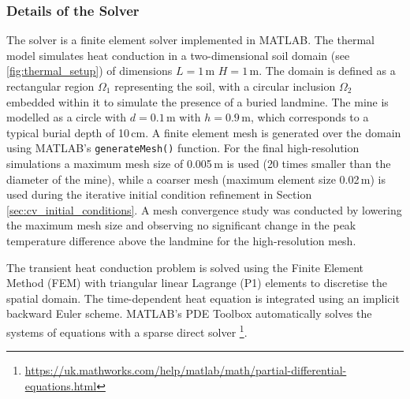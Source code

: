     
    \subsubsection{Details of the Solver}
    
        The solver is a finite element solver implemented in MATLAB. The thermal model simulates heat conduction in a two-dimensional soil domain (see \ref{fig:thermal_setup}) of dimensions $L =1$\,m $H = 1$\,m. The domain is defined as a rectangular region $\Omega_1$ representing the soil, with a circular inclusion $\Omega_2$ embedded within it to simulate the presence of a buried landmine. The mine is modelled as a circle with \(d=0.1\,\text{m}\) with \(h=0.9\,\text{m}\), which corresponds to a typical burial depth of 10\,cm. A finite element mesh is generated over the domain using MATLAB's \texttt{generateMesh()} function. For the final high-resolution simulations a maximum mesh size of 0.005\,m is used (20 times smaller than the diameter of the mine), while a coarser mesh (maximum element size 0.02\,m) is used during the iterative initial condition refinement in Section \ref{sec:cv_initial_conditions}. A mesh convergence study was conducted by lowering the maximum mesh size and observing no significant change in the peak temperature difference above the landmine for the high-resolution mesh.
        
        The transient heat conduction problem is solved using the Finite Element Method (FEM) with triangular linear Lagrange (P1) elements to discretise the spatial domain. The time-dependent heat equation is integrated using an implicit backward Euler scheme. MATLAB's PDE Toolbox automatically solves the systems of equations with a sparse direct solver \footnote{\url{https://uk.mathworks.com/help/matlab/math/partial-differential-equations.html}}.
    
